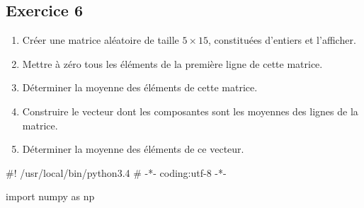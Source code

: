 \documentclass[10pt,fleqn]{article} %
\begin{document}
\begin{multicols}{2}
%
%    
%
%

\section*{Exercice 6}
\begin{enumerate}
\item 
  Créer une matrice aléatoire de taille $5\times 15$, constituées d'entiers et
  l'afficher.

\item
  Mettre à zéro tous les éléments de la première ligne de cette matrice.

\item
  Déterminer la moyenne des éléments de cette matrice. 
\item
  Construire le vecteur
  dont les composantes sont les moyennes des lignes de la matrice.
\item
  Déterminer la moyenne des éléments de ce vecteur.
\end{enumerate}

\ifprof 
\begin{corrige}
\begin{python}
#! /usr/local/bin/python3.4
# -*- coding:utf-8 -*-
    
import numpy as np


\end{python}
\end{corrige}
\end{multicols}
\end{document}
